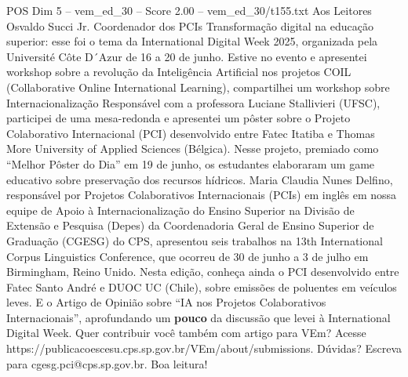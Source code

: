 \begin{textsample}{POS Dim 5 – vem\_ed\_30 – Score 2.00 – vem\_ed\_30/t155.txt}  \label{ex:f5_pos_033}
Aos Leitores Osvaldo Succi Jr.
Coordenador dos PCIs Transformação digital na educação superior: esse foi o tema da International Digital Week 2025, organizada pela Université Côte D´Azur de 16 a 20 de junho.
Estive no evento e apresentei workshop sobre a revolução da Inteligência Artificial nos projetos COIL (Collaborative Online International Learning), compartilhei um workshop sobre Internacionalização Responsável com a professora Luciane Stallivieri (UFSC), participei de uma mesa-redonda e apresentei um pôster sobre o Projeto Colaborativo Internacional (PCI) desenvolvido entre Fatec Itatiba e Thomas More University of Applied Sciences (Bélgica).
Nesse projeto, premiado como “Melhor Pôster do Dia” em 19 de junho, os estudantes elaboraram um game educativo sobre preservação dos recursos hídricos.
Maria Claudia Nunes Delfino, responsável por Projetos Colaborativos Internacionais (PCIs) em inglês em nossa equipe de Apoio à Internacionalização do Ensino Superior na Divisão de Extensão e Pesquisa (Depes) da Coordenadoria Geral de Ensino Superior de Graduação (CGESG) do CPS, apresentou seis trabalhos na 13th International Corpus Linguistics Conference, que ocorreu de 30 de junho a 3 de julho em Birmingham, Reino Unido.
Nesta edição, conheça ainda o PCI desenvolvido entre Fatec Santo André e DUOC UC (Chile), sobre emissões de poluentes em veículos leves.
E o Artigo de Opinião sobre “IA nos Projetos Colaborativos Internacionais”, aprofundando um \textbf{pouco} da discussão que levei à International Digital Week.
Quer contribuir você também com artigo para VEm?
Acesse https://publicacoescesu.cps.sp.gov.br/VEm/about/submissions.
Dúvidas?
Escreva para cgesg.pci@cps.sp.gov.br.
Boa leitura!

\end{textsample}
